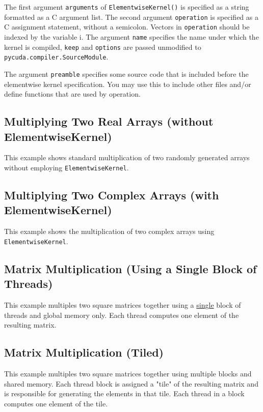 \documentclass{article}
\begin{document}
The first argument {\tt arguments} of {\tt ElementwiseKernel()} is specified as a string formatted as 
a C argument list. The second argument {\tt operation} is specified as a C assignment statement, 
without a semicolon. Vectors in {\tt operation} should be indexed by the variable i. The argument 
{\tt name} specifies the name under which the kernel is compiled, {\tt keep} and {\tt options} 
are passed unmodified to {\tt pycuda.compiler.SourceModule}.

The argument {\tt preamble} specifies some source code that is included before the elementwise 
kernel specification. You may use this to include other files and/or define functions that 
are used by operation.

\subsection{Multiplying Two Real Arrays (without ElementwiseKernel)}

This example shows standard multiplication of two randomly generated 
arrays without employing {\tt ElementwiseKernel}. 

\subsection{Multiplying Two Complex Arrays (with ElementwiseKernel)}

This example shows the multiplication of two complex arrays using 
{\tt ElementwiseKernel}.  

\subsection{Matrix Multiplication (Using a Single Block of Threads)}

This example multiples two square matrices together using a \underline{single} block 
of threads and global memory only. Each thread computes one element of 
the resulting matrix.

\subsection{Matrix Multiplication (Tiled)}

This example multiples two square matrices together using multiple blocks and shared memory. Each thread block is assigned a "tile" of the resulting matrix and is responsible for generating the elements in that tile. Each thread in a block computes one element of the tile. 
\end{document}
